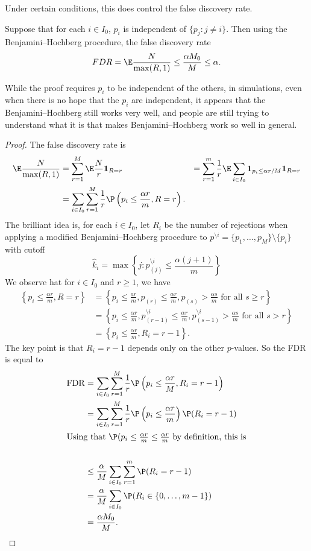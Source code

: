 \documentclass[a4paper]{article}
\begin{document}
Under certain conditions, this does control the false discovery rate.
\begin{thm}
  Suppose that for each $i \in I_0$, $p_i$ is independent of $\{p_j: j \not= i\}$. Then using the Benjamini--Hochberg procedure, the false discovery rate
  \[
    FDR = \E \frac{N}{\max (R, 1)} \leq \frac{\alpha M_0}{M} \leq \alpha.
  \]
\end{thm}
While the proof requires $p_i$ to be independent of the others, in simulations, even when there is no hope that the $p_i$ are independent, it appears that the Benjamini--Hochberg still works very well, and people are still trying to understand what it is that makes Benjamini--Hochberg work so well in general.

\begin{proof}
  The false discovery rate is
  \begin{align*}
    \E \frac{N}{\max (R, 1)} &= \sum_{r = 1}^M \E \frac{N}{r} \mathbf{1}_{R = r}\
    &= \sum_{r = 1}^m \frac{1}{r} \E \sum_{i \in I_0} \mathbf{1}_{p_i \leq \alpha r/M} \mathbf{1}_{R = r}\\
    &= \sum_{i \in I_0} \sum_{r = 1}^M \frac{1}{r} \P\left(p_i \leq \frac{\alpha r}{m}, R = r\right).
  \end{align*}
  The brilliant idea is, for each $i \in I_0$, let $R_i$ be the number of rejections when applying a modified Benjamini--Hochberg procedure to $p^{\setminus i} = \{p_1, \ldots, p_M\} \setminus \{p_i\}$ with cutoff
  \[
    \hat{k}_i = \max \left\{j: p_{(j)}^{\setminus i} \leq \frac{\alpha (j + 1)}{m}\right\}
  \]
  We observe hat for $i \in I_0$ and $r \geq 1$, we have
  \begin{align*}
    \left\{ p_i \leq \frac{\alpha r}{m} , R = r\right\} &= \left\{ p_i \leq \frac{ar}{m}, p_{(r)}  \leq \frac{\alpha r}{m}, p_{(s)} > \frac{\alpha s}{m}\text{ for all }s \geq r\right\}\\
    &= \left\{p_i \leq \frac{\alpha r}{m}, p_{(r - 1)}^{\setminus i} \leq \frac{\alpha r}{m}, p^{\setminus i}_{(s - 1)} > \frac{\alpha s}{m}\text{ for all }s > r\right\}\\
    &= \left\{p_i \leq \frac{\alpha r}{m}, R_i = r - 1\right\}.
  \end{align*}
  The key point is that $R_i = r - 1$ depends only on the other $p$-values. So the FDR is equal to
  \begin{align*}
    \mathrm{FDR} &= \sum_{i \in I_0} \sum_{r = 1}^M \frac{1}{r} \P\left(p_i \leq \frac{\alpha r}{M}, R_i = r - 1\right)\\
    &= \sum_{i \in I_0} \sum_{r = 1}^M \frac{1}{r} \P \left(p_i \leq \frac{\alpha r}{m}\right) \P(R_i = r - 1)\\
    \intertext{Using that $\P(p_i \leq \frac{\alpha r}{m} \leq \frac{\alpha r}{m}$ by definition, this is}\\
    &\leq \frac{\alpha }{M} \sum_{i \in I_0} \sum_{r = 1}^m \P(R_i = r - 1)\\
    &= \frac{\alpha}{M} \sum_{i \in I_0} \P(R_i \in \{0, \ldots, m - 1\})\\
    &= \frac{\alpha M_0}{M}.
  \end{align*}
\end{proof}
\end{document}
